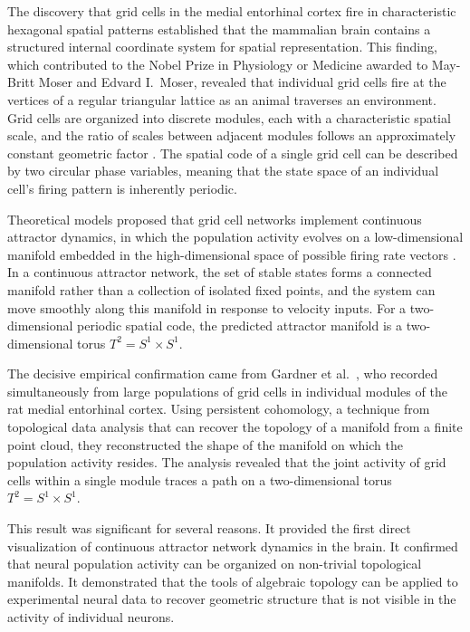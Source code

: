 \documentclass[12pt,a4paper]{article}
\makeatletter
\let\orig@subsection\subsection
\renewcommand{\subsection}{\@ifstar{\orig@subsection*}{\@dblarg{\my@subsection}}}
\def\my@subsection[#1]#2{\orig@subsection[#1]{#2}\noindent\@afterindentfalse\@afterheading}
\makeatother
\begin{document}
The discovery that grid cells in the medial entorhinal cortex fire in characteristic hexagonal spatial patterns \cite{Hafting2005} established that the mammalian brain contains a structured internal coordinate system for spatial representation. This finding, which contributed to the Nobel Prize in Physiology or Medicine awarded to May-Britt Moser and Edvard I.\ Moser, revealed that individual grid cells fire at the vertices of a regular triangular lattice as an animal traverses an environment. Grid cells are organized into discrete modules, each with a characteristic spatial scale, and the ratio of scales between adjacent modules follows an approximately constant geometric factor \cite{Stensola2012}. The spatial code of a single grid cell can be described by two circular phase variables, meaning that the state space of an individual cell's firing pattern is inherently periodic.

Theoretical models proposed that grid cell networks implement continuous attractor dynamics, in which the population activity evolves on a low-dimensional manifold embedded in the high-dimensional space of possible firing rate vectors \cite{Yoon2013}. In a continuous attractor network, the set of stable states forms a connected manifold rather than a collection of isolated fixed points, and the system can move smoothly along this manifold in response to velocity inputs. For a two-dimensional periodic spatial code, the predicted attractor manifold is a two-dimensional torus $T^2 = S^1 \times S^1$.

\subsection{The Gardner et al.\ Discovery}

The decisive empirical confirmation came from Gardner et al.\ \cite{Gardner2022}, who recorded simultaneously from large populations of grid cells in individual modules of the rat medial entorhinal cortex. Using persistent cohomology, a technique from topological data analysis that can recover the topology of a manifold from a finite point cloud, they reconstructed the shape of the manifold on which the population activity resides. The analysis revealed that the joint activity of grid cells within a single module traces a path on a two-dimensional torus $T^2 = S^1 \times S^1$.

This result was significant for several reasons. It provided the first direct visualization of continuous attractor network dynamics in the brain. It confirmed that neural population activity can be organized on non-trivial topological manifolds. It demonstrated that the tools of algebraic topology can be applied to experimental neural data to recover geometric structure that is not visible in the activity of individual neurons.
\end{document}
